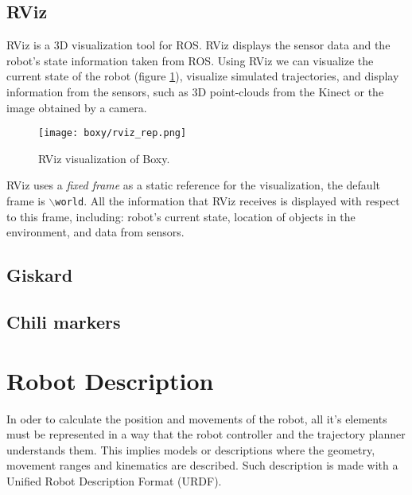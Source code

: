 \subsection{RViz}
\label{subsec:rviz}

RViz is a 3D visualization tool for ROS. RViz displays the sensor data and the robot's state information taken from ROS. Using RViz we can visualize the current state of the robot (figure \ref{fig:rviz}), visualize simulated trajectories, and display information from the sensors, such as 3D point-clouds from the Kinect or the image obtained by a camera.

\begin{figure}[H]
	\centering
	\texttt{[image: boxy/rviz\_rep.png]}
	\vspace{-10pt}
	\caption{RViz visualization of Boxy.}
	\vspace{-15pt}
	\label{fig:rviz}
\end{figure}

RViz uses a \textit{fixed frame} as a static reference for the visualization, the default frame is  \texttt{$\backslash$world}. All the information that RViz receives is displayed with respect to this frame, including: robot's current state, location of objects in the environment, and data from sensors.

\subsection{Giskard}
\label{subsec:giskard}

\subsection{Chili markers}



\section{Robot Description}

In oder to calculate the position and movements of the robot, all it's elements must be  represented in a way that the robot controller and the trajectory planner understands them. This implies models or descriptions where the geometry, movement ranges and kinematics are described. Such description is made with a Unified Robot Description Format (URDF).



